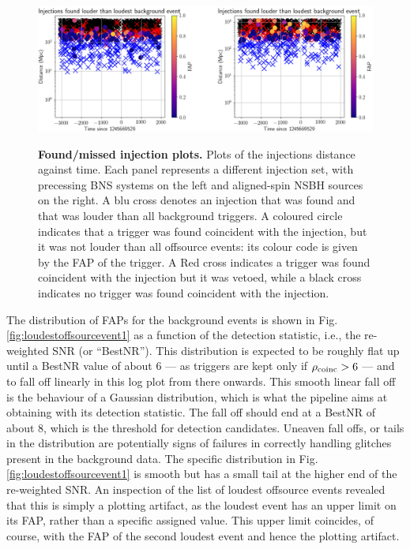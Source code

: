 \documentclass[binding=0.6cm, LaM]{sapthesis}
\begin{document}
        \begin{figure}[!t]
          \noindent
          \label{missinj1}
          \centering
          \includegraphics[width=\textwidth]{missinj1}
          \caption{\textbf{Found/missed injection plots.} Plots of the injections distance against time. Each panel represents a different injection set, with precessing BNS systems on the left and aligned-spin NSBH sources on the right. A blu cross denotes an injection that was found and that was louder than all background triggers. A coloured circle indicates that a trigger was found coincident with the injection, but it was not louder than all offsource events: its colour code is given by the FAP of the trigger.  A Red cross indicates a trigger was found coincident with the injection but it was vetoed, while a black cross indicates no trigger was found coincident with the injection.}
          \label{fig:missinj1}
        \end{figure}

	The distribution of FAPs for the background events is shown in Fig.\,\ref{fig:loudestoffsourcevent1} 
	as a function of the detection statistic, i.e., the re-weighted SNR (or ``BestNR'').
	This distribution is expected to be roughly flat up until a BestNR value of about $6$ 
	--- as triggers are kept only if $\rho_{\rm coinc} > 6$ --- 
	and to fall off linearly in this log plot from there onwards.  
	This smooth linear fall off is the behaviour of a Gaussian distribution, 
	which is what the pipeline aims at obtaining with its detection statistic.  
	The fall off should end at a BestNR  of about $8$, 
	which is the threshold for detection candidates. 
	Uneaven fall offs, or tails in the distribution are potentially signs 
	of failures in correctly handling glitches present in the background data. 
	The specific distribution in Fig.\,\ref{fig:loudestoffsourcevent1} is smooth 
	but has a small tail at the higher end of the re-weighted SNR. 
	An inspection of the list of loudest offsource events revealed that 
	this is simply a plotting artifact, as the loudest event has an upper limit on its FAP, 
	rather than a specific assigned value.  
	This upper limit coincides, of course, with the FAP of the second loudest event and hence the plotting artifact.
\end{document}
